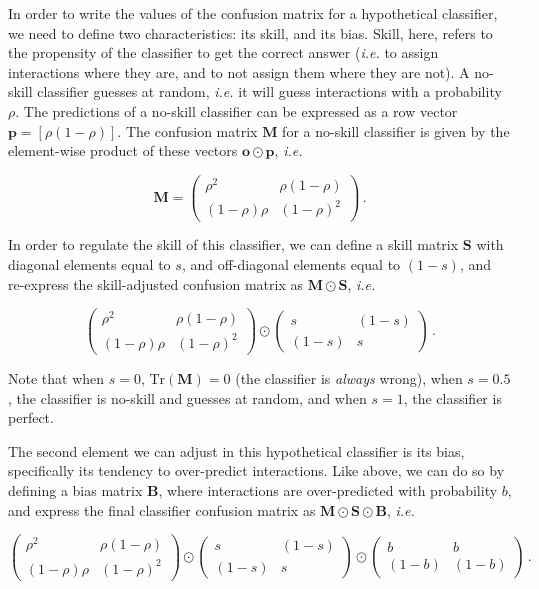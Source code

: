 \documentclass[11pt]{article}
\begin{document}
In order to write the values of the confusion matrix for a hypothetical
classifier, we need to define two characteristics: its skill, and its
bias. Skill, here, refers to the propensity of the classifier to get the
correct answer (\emph{i.e.} to assign interactions where they are, and
to not assign them where they are not). A no-skill classifier guesses at
random, \emph{i.e.} it will guess interactions with a probability
\(\rho\). The predictions of a no-skill classifier can be expressed as a
row vector \(\mathbf{p} = [\rho (1-\rho)]\). The confusion matrix
\(\mathbf{M}\) for a no-skill classifier is given by the element-wise
product of these vectors \(\mathbf{o} \odot \mathbf{p}\), \emph{i.e.}

\[
\mathbf{M} = \begin{pmatrix}
    \rho^2 & \rho (1-\rho) \\
    (1-\rho) \rho & (1-\rho)^2
\end{pmatrix} \,.
\]

In order to regulate the skill of this classifier, we can define a skill
matrix \(\mathbf{S}\) with diagonal elements equal to \(s\), and
off-diagonal elements equal to \((1-s)\), and re-express the
skill-adjusted confusion matrix as \(\mathbf{M} \odot \mathbf{S}\),
\emph{i.e.}

\[
\begin{pmatrix}
    \rho^2 & \rho (1-\rho) \\
    (1-\rho) \rho & (1-\rho)^2
\end{pmatrix} \odot \begin{pmatrix}
    s & (1-s) \\
    (1-s) & s
\end{pmatrix} \,.
\]

Note that when \(s=0\), \(\text{Tr}(\mathbf{M}) = 0\) (the classifier is
\emph{always} wrong), when \(s=0.5\), the classifier is no-skill and
guesses at random, and when \(s=1\), the classifier is perfect.

The second element we can adjust in this hypothetical classifier is its
bias, specifically its tendency to over-predict interactions. Like
above, we can do so by defining a bias matrix \(\mathbf{B}\), where
interactions are over-predicted with probability \(b\), and express the
final classifier confusion matrix as
\(\mathbf{M}\odot \mathbf{S}\odot \mathbf{B}\), \emph{i.e.}

\[
\begin{pmatrix}
    \rho^2 & \rho (1-\rho) \\
    (1-\rho) \rho & (1-\rho)^2
\end{pmatrix} \odot \begin{pmatrix}
    s & (1-s) \\
    (1-s) & s
\end{pmatrix} \odot \begin{pmatrix}
    b & b \\
    (1-b) & (1-b)
\end{pmatrix}\,.
\]
\end{document}
